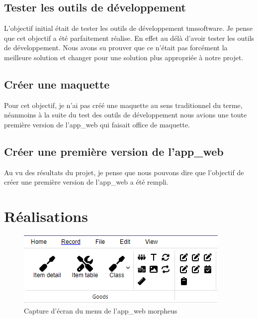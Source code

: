 \documentclass[a4paper, 12pt, french]{article}
\begin{document}
				\subsection{Tester les outils de développement}
					L'objectif initial était de tester les outils de développement \gls{tmssoftware}. Je pense que cet objectif a été parfaitement réalise. En effet au délà d'avoir tester les outils de développement. Nous avons su prouver que ce n'était pas forcément la meilleure solution et changer pour une solution plus appropriée à notre projet.

				\subsection{Créer une maquette}
					Pour cet objectif, je n'ai pas créé une maquette au sens traditionnel du terme, néanmoins à la suite du test des outils de développement nous avions une toute première version de l'\gls{app_web} qui faisait office de maquette.
				
				\subsection{Créer une première version de l'\gls{app_web}}
					Au vu des résultats du projet, je pense que nous pouvons dire que l'objectif de créer une première version de l'\gls{app_web} a été rempli.
				
			\section{Réalisations}
				\begin{figure}[ht!]
					\begin{center}
						\includegraphics[width=0.7\linewidth]{images/react_menu.png}
					\end{center}
					\caption{Capture d'écran du menu de l'\gls{app_web} morpheus}
					\label{fig:react_menu}
				\end{figure}
				
				\newpage
				
\end{document}

